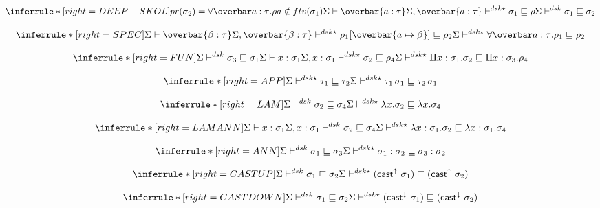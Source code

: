 
\[
\inferrule*[right=DEEP-SKOL]
{pr(\sigma_2)=\forallvars{a:\tau}. \rho \\ a \notin ftv(\sigma_1) \\
\Sigma \vdash \overbar{a:\tau} \\
\Sigma, \overbar{a:\tau} \polymorphicstar \sigma_1 \sqsubseteq \rho }
{\Sigma \polymorphic \sigma_1 \sqsubseteq \sigma_2}
\]


\[
\inferrule*[right=SPEC]
{\Sigma \vdash \overbar{\beta: \tau} \\
\Sigma, \overbar{\beta:\tau} \polymorphicstar \rho_1[\overbar{a \mapsto \beta}] \sqsubseteq \rho_2}
{\Sigma \polymorphicstar \forallvars{a:\tau}.\rho_1 \sqsubseteq \rho_2}
\]

\[
\inferrule*[right=FUN]
{\Sigma \polymorphic  \sigma_3 \sqsubseteq \sigma_1 \\
 \Sigma \vdash x:\sigma_1 \\
 \Sigma, x:\sigma_1 \polymorphicstar  \sigma_2 \sqsubseteq \rho_4}
{\Sigma \polymorphicstar \Pi x:\sigma_1. \sigma_2 \sqsubseteq \Pi x:\sigma_3. \rho_4}
\]

\[
\inferrule*[right=APP]
{
\Sigma \polymorphicstar  \tau_1 \sqsubseteq \tau_2}
{\Sigma \polymorphicstar \tau_1\, \sigma_1 \sqsubseteq \tau_2\, \sigma_1}
\]

\[
\inferrule*[right=LAM]
{
\Sigma \polymorphic \sigma_2 \sqsubseteq \sigma_4}
{\Sigma \polymorphicstar \lambda x. \sigma_2 \sqsubseteq \lambda x. \sigma_4}
\]

\[
\inferrule*[right=LAMANN]
{
\Sigma \vdash x:\sigma_1 \\
\Sigma, x:\sigma_1 \polymorphic \sigma_2 \sqsubseteq \sigma_4}
{\Sigma \polymorphicstar \lambda x:\sigma_1. \sigma_2 \sqsubseteq \lambda x:\sigma_1. \sigma_4}
\]

\[
\inferrule*[right=ANN]
{
\Sigma \polymorphic  \sigma_1 \sqsubseteq \sigma_3}
{\Sigma \polymorphicstar \sigma_1:\sigma_2 \sqsubseteq \sigma_3:\sigma_2}
\]

\[
\inferrule*[right=CASTUP]
{
\Sigma \polymorphic  \sigma_1 \sqsubseteq \sigma_2}
{\Sigma \polymorphicstar  (\castupe \sigma_1) \sqsubseteq  (\castupe \sigma_2)  }
\]


\[
\inferrule*[right=CASTDOWN]
{
\Sigma \polymorphic  \sigma_1 \sqsubseteq \sigma_2}
{\Sigma \polymorphicstar  (\castdowne \sigma_1) \sqsubseteq  (\castdowne \sigma_2)  }
\]


